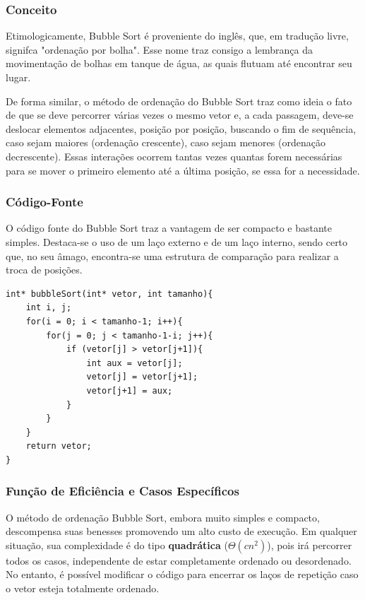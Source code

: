 \documentclass[a4paper, 12pt]{article}
\begin{document}
\subsubsection{Conceito}
\tab Etimologicamente, Bubble Sort é proveniente do inglês, que, em tradução livre, signifca "ordenação por bolha". Esse nome traz consigo a lembrança da movimentação de bolhas em tanque de água, as quais flutuam até encontrar seu lugar.

De forma similar, o método de ordenação do Bubble Sort traz como ideia o fato de que se deve percorrer várias vezes o mesmo vetor e, a cada passagem, deve-se deslocar elementos adjacentes, posição por posição, buscando o fim de sequência, caso sejam maiores (ordenação crescente), caso sejam menores (ordenação decrescente). Essas interações ocorrem tantas vezes quantas forem necessárias para se mover o primeiro elemento até a última posição, se essa for a necessidade.


\subsubsection{Código-Fonte}
\tab{}O código fonte do Bubble Sort traz a vantagem de ser compacto e bastante simples. Destaca-se o uso de um laço externo e de um laço interno, sendo certo que, no seu âmago, encontra-se uma estrutura de comparação para realizar a troca de posições.

\begin{verbatim}
int* bubbleSort(int* vetor, int tamanho){
    int i, j;
    for(i = 0; i < tamanho-1; i++){
        for(j = 0; j < tamanho-1-i; j++){
            if (vetor[j] > vetor[j+1]){
                int aux = vetor[j];
                vetor[j] = vetor[j+1];
                vetor[j+1] = aux;		
            }
        }
    }	
    return vetor;
}
\end{verbatim}

\subsubsection{Função de Eficiência e Casos Específicos}
\tab{}O método de ordenação Bubble Sort, embora muito simples e compacto, descompensa suas benesses promovendo um alto custo de execução. Em qualquer situação, sua complexidade é do tipo \textbf{quadrática} ($\varTheta(cn^2)$), pois irá percorrer todos os casos, independente de estar completamente ordenado ou desordenado. No entanto, é possível modificar o código para encerrar os laços de repetição caso o vetor esteja totalmente ordenado.
\end{document}
